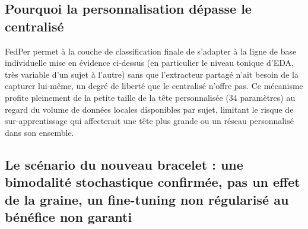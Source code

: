 \documentclass{acmart}
\begin{document}
\subsection{Pourquoi la personnalisation dépasse le centralisé}

FedPer permet à la couche de classification finale de s'adapter à la ligne
de base individuelle mise en évidence ci-dessus (en particulier le niveau
tonique d'EDA, très variable d'un sujet à l'autre) sans que l'extracteur
partagé n'ait besoin de la capturer lui-même, un degré de liberté que le
centralisé n'offre pas. Ce mécanisme profite pleinement de la petite taille
de la tête personnalisée (34 paramètres) au regard du volume de données
locales disponibles par sujet, limitant le risque de sur-apprentissage qui
affecterait une tête plus grande ou un réseau personnalisé dans son
ensemble.

\subsection{Le scénario du nouveau bracelet : une bimodalité stochastique
confirmée, pas un effet de la graine, un fine-tuning non régularisé au
bénéfice non garanti}
\end{document}
